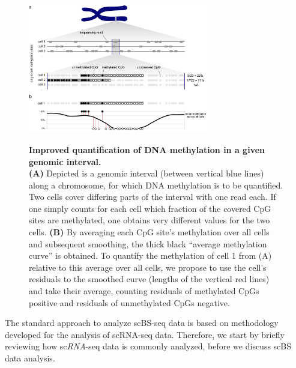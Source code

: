 \documentclass[twocolumn,10pt]{article}
\begin{document}
\begin{figure}[t]
    \begin{center}
        \includegraphics[width=0.7\textwidth]{figures/Fig_residuals_AB.png}\\
    \end{center}
    \caption{\small \textbf{Improved quantification of DNA methylation in a given genomic interval.}\\
    \textbf{(A)} Depicted is a genomic interval (between vertical blue lines) along a chromosome, for which DNA methylation is to be quantified.
    Two cells cover differing parts of the interval with one read each.
    If one simply counts for each cell which fraction of the covered CpG sites are methylated, one obtains very different values for the two cells.
    \textbf{(B)} By averaging each CpG site's methylation over all cells and subsequent smoothing, the thick black ``average methylation curve'' is obtained.
    To quantify the methylation of cell 1 from (A) relative to this average over all cells, we propose to use the cell's residuals to the smoothed curve (lengths of the vertical red lines) and take their average, counting residuals of methylated CpGs positive and residuals of unmethylated CpGs negative.}
    \label{fig:smoothres}
\end{figure}


The standard approach to analyze scBS-seq data is based on methodology developed for the analysis of scRNA-seq data.
Therefore, we start by briefly reviewing how sc\emph{RNA}-seq data is commonly analyzed, before we discuss scBS data analysis.
\end{document}
